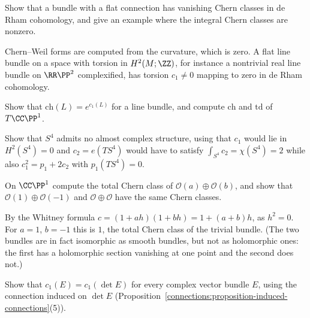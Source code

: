 \begin{exercise}\label{characteristic-classes:exercise-flat-bundle-classes}
Show that a bundle with a flat connection has vanishing Chern classes in de Rham cohomology, and give an example where the integral Chern classes are nonzero.
\end{exercise}

\begin{solution}
Chern--Weil forms are computed from the curvature, which is zero. A flat line bundle on a space with torsion in $H^2(M; \ZZ)$, for instance a nontrivial real line bundle on $\RR\PP^2$ complexified, has
torsion $c_1 \neq 0$ mapping to zero in de Rham cohomology.
\end{solution}

\begin{exercise}\label{characteristic-classes:exercise-chern-character-line}
Show that $\mathrm{ch}(L) = e^{c_1(L)}$ for a line bundle, and compute $\mathrm{ch}$ and $\mathrm{td}$ of $T\CC\PP^1$.
\end{exercise}

\begin{exercise}\label{characteristic-classes:exercise-no-almost-complex}
Show that $S^4$ admits no almost complex structure, using that $c_1$ would lie in $H^2(S^4) = 0$ and $c_2 = e(TS^4)$ would have to satisfy $\int_{S^4}c_2 = \chi(S^4) = 2$ while also
$c_1^2 = p_1 + 2c_2$ with $p_1(TS^4) = 0$.
\end{exercise}

\begin{exercise}\label{characteristic-classes:exercise-chern-sum-cp1}
On $\CC\PP^1$ compute the total Chern class of $\mathcal{O}(a) \oplus \mathcal{O}(b)$, and show that $\mathcal{O}(1) \oplus \mathcal{O}(-1)$ and $\mathcal{O} \oplus \mathcal{O}$ have the same Chern classes.
\end{exercise}

\begin{solution}
By the Whitney formula $c = (1 + ah)(1 + bh) = 1 + (a + b)h$, as $h^2 = 0$. For $a = 1$, $b = -1$ this is $1$, the total Chern class of the trivial bundle. (The two bundles are in
fact isomorphic as smooth bundles, but not as holomorphic ones: the first has a holomorphic section vanishing at one point and the second does not.)
\end{solution}

\begin{exercise}\label{characteristic-classes:exercise-c1-determinant}
Show that $c_1(E) = c_1(\det E)$ for every complex vector bundle $E$, using the connection induced on $\det E$ (Proposition~\ref{connections:proposition-induced-connections}(5)).
\end{exercise}

